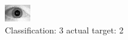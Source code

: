 \begin{figure}[h!]
\begin{center}
\includegraphics[width=0.60\columnwidth]{figures/ID1787_class_3_target_2.png}
\end{center}
\caption{ Classification: 3 actual target: 2}
\label{fig:ID1787_class_3_target_2}
\end{figure}
